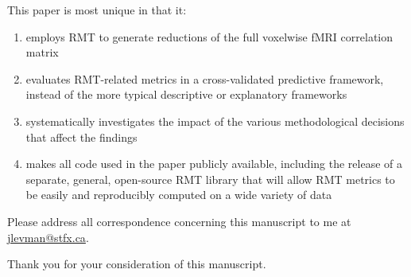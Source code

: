 \documentclass[10pt,letter]{article}
\begin{document}
This paper is most unique in that it:

\begin{enumerate}
  \item employs RMT to generate reductions of the full voxelwise fMRI
        correlation matrix
  \item evaluates RMT-related metrics in a cross-validated predictive
        framework, instead of the more typical descriptive or explanatory
        frameworks
  \item systematically investigates the impact of the various methodological
        decisions that affect the findings
  \item makes all code used in the paper publicly available, including the release of a
        separate, general, open-source RMT
        library \citep{dm-bergerStfxecutablesEmpyricalRMTV12022} that will allow
        RMT metrics to be easily and reproducibly computed on a wide variety of
        data
\end{enumerate}

Please address all correspondence concerning this manuscript to me at \href{jlevman@stfx.ca}{jlevman@stfx.ca}.

Thank you for your consideration of this manuscript.







\end{document}
